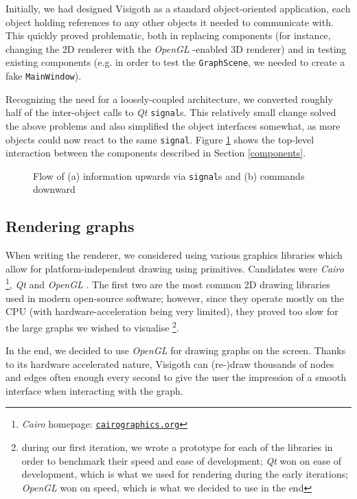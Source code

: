 \documentclass[a4paper,11pt,titlepage]{article}
\let\stdhref\href
\renewcommand{\href}[2]{\stdhref{#1}{\texttt{#2}}}
\newcommand{\code}[1]{\texttt{#1}}
\newcommand{\buzz}[1]{\emph{#1}}
\newcommand{\Qt}{\buzz{Qt} }
\newcommand{\OpenGL}{\buzz{OpenGL} }
\newcommand{\Cairo}{\buzz{Cairo} }
\begin{document}
Initially, we had designed Visigoth as a standard object-oriented
application, each object holding references to any other objects it
needed to communicate with. This quickly proved problematic, both in
replacing components (for instance, changing the 2D renderer with the
\OpenGL-enabled 3D renderer) and in testing existing components
(e.g. in order to test the \code{GraphScene}, we needed to create a
fake \code{MainWindow}).

Recognizing the need for a loosely-coupled architecture, we converted
roughly half of the inter-object calls to \Qt \code{signal}s. This
relatively small change solved the above problems and also simplified
the object interfaces somewhat, as more objects could now react to the
same \code{signal}. Figure \ref{fig:interaction} shows the top-level
interaction between the components described in Section
\ref{components}.

\begin{figure}[ht]
  \centering
  
  \caption{Flow of (a) information upwards via \code{signal}s and (b)
    commands downward}
  \label{fig:interaction}
\end{figure}

\subsection{Rendering graphs}

When writing the renderer, we considered using various graphics
libraries which allow for platform-independent drawing using
primitives. Candidates were \Cairo \footnote{\Cairo homepage:
  \href{http://cairographics.org/}{cairographics.org}}, \Qt and
\OpenGL. The first two are the most common 2D drawing libraries used
in modern open-source software; however, since they operate mostly on
the CPU (with hardware-acceleration being very limited), they proved
too slow for the large graphs we wished to visualise \footnote{during
  our first iteration, we wrote a prototype for each of the libraries
  in order to benchmark their speed and ease of development; \Qt won
  on ease of development, which is what we used for rendering during
  the early iterations; \OpenGL won on speed, which is what we decided
  to use in the end}.

In the end, we decided to use \OpenGL for drawing graphs on the
screen. Thanks to its hardware accelerated nature, Visigoth can
(re-)draw thousands of nodes and edges often enough every second to
give the user the impression of a smooth interface when interacting
with the graph.
\end{document}
